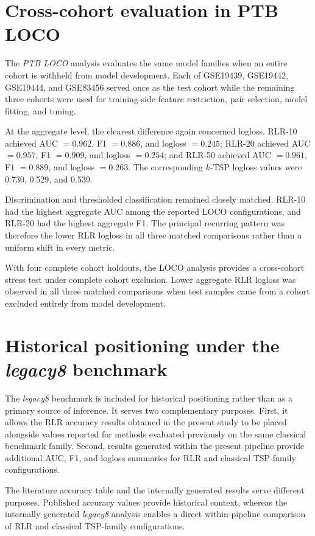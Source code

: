 \documentclass[11pt, a4paper]{article}
\begin{document}

\section{Cross-cohort evaluation in PTB LOCO}

The \emph{PTB LOCO} analysis evaluates the same model families when an entire cohort is withheld from model development. Each of GSE19439, GSE19442, GSE19444, and GSE83456 served once as the test cohort while the remaining three cohorts were used for training-side feature restriction, pair selection, model fitting, and tuning.

At the aggregate level, the clearest difference again concerned logloss. RLR-10 achieved AUC $=0.962$, F1 $=0.886$, and logloss $=0.245$; RLR-20 achieved AUC $=0.957$, F1 $=0.909$, and logloss $=0.254$; and RLR-50 achieved AUC $=0.961$, F1 $=0.889$, and logloss $=0.263$. The corresponding $k$-TSP logloss values were 0.730, 0.529, and 0.539.

Discrimination and thresholded classification remained closely matched. RLR-10 had the highest aggregate AUC among the reported LOCO configurations, and RLR-20 had the highest aggregate F1. The principal recurring pattern was therefore the lower RLR logloss in all three matched comparisons rather than a uniform shift in every metric.

With four complete cohort holdouts, the LOCO analysis provides a cross-cohort stress test under complete cohort exclusion. Lower aggregate RLR logloss was observed in all three matched comparisons when test samples came from a cohort excluded entirely from model development.

\section{Historical positioning under the \emph{legacy8} benchmark}

The \emph{legacy8} benchmark is included for historical positioning rather than as a primary source of inference. It serves two complementary purposes. First, it allows the RLR accuracy results obtained in the present study to be placed alongside values reported for methods evaluated previously on the same classical benchmark family. Second, results generated within the present pipeline provide additional AUC, F1, and logloss summaries for RLR and classical TSP-family configurations.

The literature accuracy table and the internally generated results serve different purposes. Published accuracy values provide historical context, whereas the internally generated \emph{legacy8} analysis enables a direct within-pipeline comparison of RLR and classical TSP-family configurations.
\end{document}
